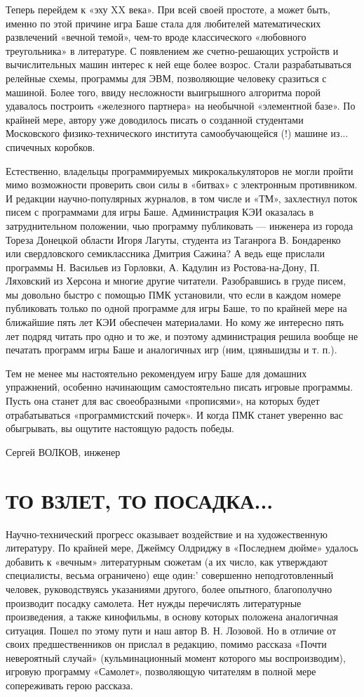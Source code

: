 \documentclass[11pt,a4paper,oneside]{article}
\begin{document}
Теперь перейдем к «эху XX века». При всей своей простоте, а может быть, именно по этой причине игра Баше стала для любителей математических развлечений «вечной темой», чем-то вроде классического «любовного треугольника» в литературе. С появлением же счетно-решающих устройств и вычислительных машин интерес к ней еще более возрос. Стали разрабатываться релейные схемы, программы для ЭВМ, позволяющие человеку сразиться с машиной. Более того, ввиду несложности выигрышного алгоритма порой удавалось построить «железного партнера» на необычной «элементной базе». По крайней мере, автору уже доводилось писать о созданной студентами Московского физико-технического института самообучающейся (!) машине из... спичечных коробков.

Естественно, владельцы программируемых микрокалькуляторов не могли пройти мимо возможности проверить свои силы в «битвах» с электронным противником. И редакции научно-популярных журналов, в том числе и «ТМ», захлестнул поток писем с программами для игры Баше. Администрация КЭИ оказалась в затруднительном положении, чью программу публиковать — инженера из города Тореза Донецкой области Игоря Лагуты, студента из Таганрога В. Бондаренко или свердловского семиклассника Дмитрия Сажина? А ведь еще прислали программы Н. Васильев из Горловки, А. Кадулин из Ростова-на-Дону, П. Ляховский из Херсона и многие другие читатели. Разобравшись в груде писем, мы довольно быстро с помощью ПМК установили, что если в каждом номере публиковать только по одной программе для игры Баше, то по крайней мере на ближайшие пять лет КЭИ обеспечен материалами. Но кому же интересно пять лет подряд читать про одно и то же, и поэтому администрация решила вообще не печатать программ игры Баше и аналогичных игр (ним, цзяньшидзы и т. п.).

Тем не менее мы настоятельно рекомендуем игру Баше для домашних упражнений, особенно начинающим самостоятельно писать игровые программы. Пусть она станет для вас своеобразными «прописями», на которых будет отрабатываться «программистский почерк». И когда ПМК станет уверенно вас обыгрывать, вы ощутите настоящую радость победы.

Сергей ВОЛКОВ, инженер

\section{ТО ВЗЛЕТ, ТО ПОСАДКА...}
Научно-технический прогресс оказывает воздействие и на художественную литературу. По крайней мере, Джеймсу Олдриджу в «Последнем дюйме» удалось добавить к «вечным» литературным сюжетам (а их число, как утверждают специалисты, весьма ограничено) еще один:' совершенно неподготовленный человек, руководствуясь указаниями другого, более опытного, благополучно производит посадку самолета. Нет нужды перечислять литературные произведения, а также кинофильмы, в основу которых положена аналогичная ситуация. Пошел по этому пути и наш автор В. Н. Лозовой. Но в отличие от своих предшественников он прислал в редакцию, помимо рассказа «Почти невероятный случай» (кульминационный момент которого мы воспроизводим), игровую программу «Самолет», позволяющую читателям в полной мере сопереживать герою рассказа.
\end{document}
